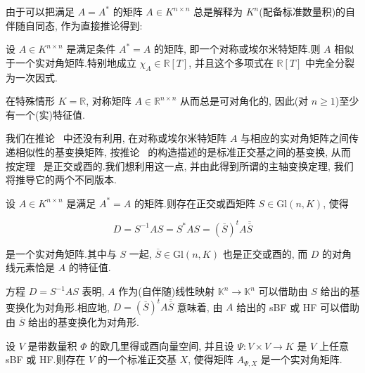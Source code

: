 由于可以把满足 $A = A^*$ 的矩阵 $A \in K^{n \times n}$ 总是解释为 $K^n$(配备标准数量积)的自伴随自同态, 作为直接推论得到:

\begin{corollary}\label{cor:7.6.5}
设 $A \in K^{n \times n}$ 是满足条件 $A^* = A$ 的矩阵, 即一个对称或埃尔米特矩阵.则 $A$ 相似于一个实对角矩阵.特别地成立 $\chi_A \in \mathbb{R}[T]$, 并且这个多项式在 $\mathbb{R}[T]$ 中完全分裂为一次因式.
\end{corollary}

在特殊情形 $K = \mathbb{R}$, 对称矩阵 $A \in \mathbb{R}^{n \times n}$ 从而总是可对角化的, 因此(对 $n \geq 1$)至少有一个(实)特征值.

我们在推论~ 中还没有利用, 在对称或埃尔米特矩阵 $A$ 与相应的实对角矩阵之间传递相似性的基变换矩阵, 按推论~ 的构造描述的是标准正交基之间的基变换, 从而按定理~ 是正交或酉的.我们想利用这一点, 并由此得到所谓的主轴变换定理, 我们将推导它的两个不同版本.

\begin{bigtheorem}\label{bigthm:7.6.6}
设 $A \in K^{n \times n}$ 是满足 $A^* = A$ 的矩阵.则存在正交或酉矩阵 $S \in \mathrm{Gl}(n, K)$, 使得

\[
D = S^{-1} A S = S^* A S = (\overline{S})^t A \overline{\overline{S}}
\]

是一个实对角矩阵.其中与 $S$ 一起, $\overline{S} \in \mathrm{Gl}(n, K)$ 也是正交或酉的, 而 $D$ 的对角线元素恰是 $A$ 的特征值.
\end{bigtheorem}

方程 $D = S^{-1} A S$ 表明, $A$ 作为(自伴随)线性映射 $\mathbb{K}^n \longrightarrow \mathbb{K}^n$ 可以借助由 $S$ 给出的基变换化为对角形.相应地, $D = (\overline{S})^t A \overline{\overline{S}}$ 意味着, 由 $A$ 给出的 sBF 或 HF 可以借助由 $\overline{S}$ 给出的基变换化为对角形.

\begin{bigtheorem}\label{bigthm:7.6.7}
设 $V$ 是带数量积 $\varPhi$ 的欧几里得或酉向量空间, 并且设 $\Psi \colon V \times V \longrightarrow K$ 是 $V$ 上任意 sBF 或 HF.则存在 $V$ 的一个标准正交基 $X$, 使得矩阵 $A_{\varPsi, X}$ 是一个实对角矩阵.
\end{bigtheorem}

